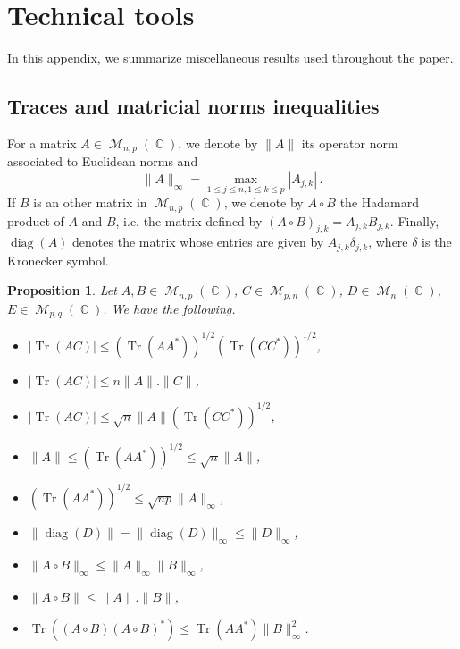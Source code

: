 \documentclass[11pt,a4paper]{article}
\DeclareMathOperator{\C}{\mathbb{C}}
\DeclareMathOperator{\MM}{\mathcal{M}}
\DeclareMathOperator{\1}{\mathbf{1}}
\DeclareMathOperator{\Tr}{\mathrm{Tr}}
\DeclareMathOperator{\diag}{\mathrm{diag}}
\newtheorem{Proposition}{Proposition}[section]
\theoremstyle{definition}
\begin{document}
\section{Technical tools} \label{appendix_tools}

In this appendix, we summarize miscellaneous results used throughout the paper.


\subsection{Traces and matricial norms inequalities} \label{traces_norms}

For a matrix $A \in \MM_{n,p}(\C)$, we denote by $\|A\|$ its operator norm associated to Euclidean norms and
\begin{displaymath}
\|A\|_{\infty} = \max_{1 \le j \le n, 1 \le k \le p} |A_{j,k}| \, .
\end{displaymath}
If $B$ is an other matrix in $\MM_{n,p}(\C)$, we denote by $A \circ B$ the Hadamard product of $A$ and $B$, i.e. the matrix defined by $(A \circ B)_{j,k} = A_{j,k}B_{j,k}$. Finally, $\diag(A)$ denotes the matrix whose entries are given by $A_{j,k}\delta_{j,k}$, where $\delta$ is the Kronecker symbol.

\begin{Proposition} \label{prop_trace}
Let $A,B \in \MM_{n,p}(\C)$, $C \in \MM_{p,n}(\C)$, $D \in \MM_n(\C)$, $E \in \MM_{p,q}(\C)$. We have the following.
\begin{itemize}
\item[(i)] $|\Tr(AC)| \le (\Tr(AA^*))^{1/2} (\Tr(CC^*))^{1/2}$,
\item[(ii)] $|\Tr(AC)| \le n \|A\|.\|C\|$,
\item[(iii)] $|\Tr(AC)| \le \sqrt{n} \|A\| (\Tr(CC^*))^{1/2}$,
\item[(iv)] $\|A\| \le (\Tr(AA^*))^{1/2} \le \sqrt{n} \|A\|$,
\item[(v)] $(\Tr(AA^*))^{1/2} \le \sqrt{np} \|A\|_{\infty}$,
\item[(vi)] $\| \diag(D) \| = \| \diag(D) \|_{\infty} \le \|D\|_{\infty}$,
\item[(vii)] $\| A \circ B \|_{\infty} \le \| A \|_{\infty} \| B \|_{\infty}$,
\item[(viii)] $\| A \circ B \| \le \|A\|.\|B\|$,
\item[(ix)] $\Tr((A \circ B)(A \circ B)^*) \le \Tr(AA^*) \|B\|_{\infty}^2$.
\end{itemize}
\end{Proposition}
\end{document}
